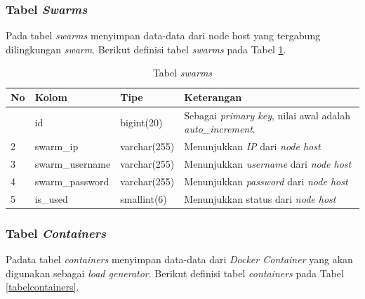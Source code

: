 			\subsubsection{Tabel \textit{Swarms}}
				Pada tabel \textit{swarms} menyimpan data-data dari node host yang tergabung dilingkungan \textit{swarm}. Berikut definisi tabel \textit{swarms} pada Tabel \ref{tabelswarms}.
				
				\begin{longtable}{|p{}|p{}|p{}|p{}|}
					\caption{Tabel \textit{swarms}} \label{tabelswarms} \\
					\hline
					\textbf{No} & \textbf{Kolom} & \textbf{Tipe} & \textbf{Keterangan} \\ \hline
					\endhead
					\endfoot
					\endlastfoot
					1 & id & bigint(20) & Sebagai \textit{primary key}, nilai awal adalah \textit{auto\_increment}. \\ \hline
					2 & swarm\_ip & varchar(255) & Menunjukkan \textit{IP} dari \textit{node host} \\ \hline
					3 & swarm\_username & varchar(255) & Menunjukkan \textit{username} dari \textit{node host} \\ \hline
					4 & swarm\_password & varchar(255) & Menunjukkan \textit{password} dari \textit{node host} \\ \hline
					5 & is\_used & smallint(6) & Menunjukkan status dari \textit{node host} \\ \hline
				\end{longtable}
		
			\subsubsection{Tabel \textit{Containers}}
				Padata tabel \textit{containers} menyimpan data-data dari \textit{Docker Container} yang akan digunakan sebagai \textit{load generator}. Berikut definisi tabel \textit{containers} pada Tabel \ref{tabelcontainers}.
				
